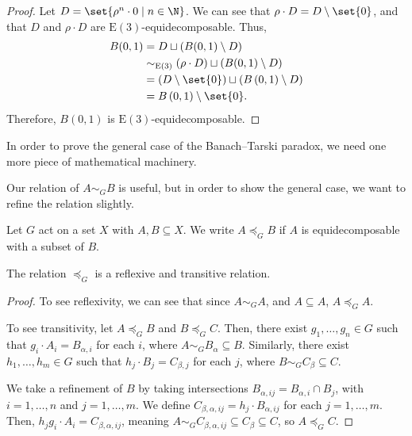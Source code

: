 \begin{proof}
  Let $D = \set{\rho^{n}\cdot 0\mid n\in \N}$. We can see that $\rho\cdot D = D\setminus \set{0}$, and that $D$ and $\rho\cdot D$ are $\text{E}(3)$-equidecomposable. Thus,
  \begin{align*}
    B(0,1) &= D\sqcup \left(B(0,1)\setminus D\right)\\
           &\sim_{\text{E}(3)}\left(\rho\cdot D\right) \sqcup \left(B(0,1)\setminus D\right)\\
           &= \left(D\setminus \set{0}\right)\sqcup \left(B\left(0,1\right)\setminus D\right)\\
           &= B\left(0,1\right)\setminus \set{0}.
  \end{align*}
  Therefore, $B(0,1)$ is $\text{E}(3)$-equidecomposable.
\end{proof}

In order to prove the general case of the Banach--Tarski paradox, we need one more piece of mathematical machinery.\newline

Our relation of $A \sim_{G} B$ is useful, but in order to show the general case, we want to refine the relation slightly.
\begin{definition}
  Let $G$ act on a set $X$ with $A,B\subseteq X$. We write $A\preceq_{G}B$ if $A$ is equidecomposable with a subset of $B$.
\end{definition}
\begin{fact}
  The relation $\preceq_{G}$ is a reflexive and transitive relation.\label{fact:preorder}
\end{fact}
\begin{proof}
  To see reflexivity, we can see that since $A\sim_{G}A$, and $A\subseteq A$, $A\preceq_{G} A$.\newline

  To see transitivity, let $A\preceq_{G}B$ and $B\preceq_{G}C$. Then, there exist $g_1,\dots,g_n\in G$ such that $g_i\cdot A_i = B_{\alpha,i}$ for each $i$, where $A\sim_{G}B_{\alpha}\subseteq B$. Similarly, there exist $h_1,\dots,h_m\in G$ such that $h_j\cdot B_j= C_{\beta,j}$ for each $j$, where $B\sim_{G}C_{\beta}\subseteq C$.\newline

  We take a refinement of $B$ by taking intersections $B_{\alpha,ij} = B_{\alpha,i}\cap B_j$, with $i=1,\dots,n$ and $j = 1,\dots,m$. We define $C_{\beta,\alpha,ij} = h_j\cdot B_{\alpha,ij}$ for each $j = 1,\dots,m$. Then, $h_jg_i\cdot A_i = C_{\beta,\alpha,ij}$, meaning $A\sim_{G}C_{\beta,\alpha,ij}\subseteq C_{\beta}\subseteq C$, so $A\preceq_{G}C$.
\end{proof}

